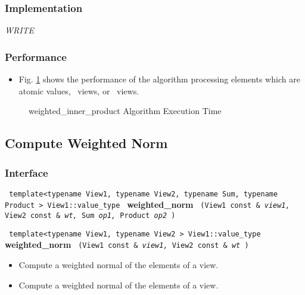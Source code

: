 \subsubsection{Implementation} %

\textit{WRITE}

\subsubsection{Performance} %

\begin{itemize}
\item
Fig. \ref{fig:wt-inner-alg-exec-exper}
shows the performance of the algorithm processing
elements which are atomic values, \stl\ views, or \stapl\ views.
\end{itemize}

\begin{figure}[p]
\caption{weighted\_inner\_product Algorithm Execution Time}
\label{fig:wt-inner-alg-exec-exper}
\end{figure}

 
\subsection{Compute Weighted Norm} \label{sec-num-wt_norm}

\subsubsection{Interface} %

\noindent
\texttt{%
template<typename View1, typename View2, typename Sum, typename Product >
\newline
View1::value\_type 
}
\newline
\textbf{weighted\_norm}%
\texttt{%
(View1 const \&
\textit{view1,}%
View2 const \&
\textit{wt,}%
Sum 
\textit{op1,}%
Product 
\textit{op2}%
)
}
\vspace{0.4cm}

\noindent
\texttt{%
template<typename View1, typename View2 >
\newline
View1::value\_type 
}
\newline
\textbf{weighted\_norm}%
\texttt{%
(View1 const \&
\textit{view1,}%
View2 const \&
\textit{wt}%
)
}

\begin{itemize}
\item
Compute a weighted normal of the elements of a view. 
\item
Compute a weighted normal of the elements of a view. 
\end{itemize}

